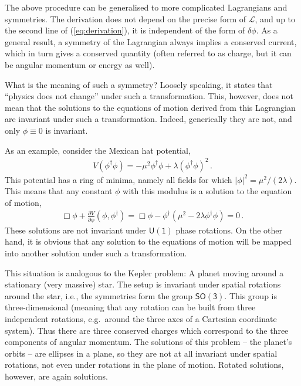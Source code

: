 \documentclass[12pt]{report}
\renewcommand{\L}{\ensuremath{\mathscr{L}}}
\newcommand{\2}{\ensuremath{\sqrt{2}\,}}
\renewcommand{\L}{\ensuremath{\mathscr{L}}}
\begin{document}
{      The above procedure can be generalised to more complicated Lagrangians and
      symmetries. The derivation does not depend on the precise form of $\L$, and up to the second
      line of (\ref{eq:derivation}), it is independent of the form of $\delta \phi$. As a general
      result, a symmetry of the Lagrangian always implies a conserved current, which in turn gives a
      conserved quantity (often referred to as charge, but it can be angular momentum or energy as
      well). 
      
      What is the meaning of such a symmetry? Loosely speaking, it states that ``physics does not
      change'' under such a transformation. This, however, does not mean that the solutions to the
      equations of motion derived from this Lagrangian are invariant under such a
      transformation. Indeed, generically they are not, and only $\phi\equiv 0$ is invariant.

      As an example, consider the Mexican hat potential,
      \begin{align}
        V(\phi^\dagger\phi)=-\mu^2 \phi^\dagger\phi +\lambda\left(\phi^\dagger\phi\right)^2\,.
      \end{align}
      This potential has a ring of minima, namely all fields for which
      $\left|\phi\right|^2=\mu^2/(2\lambda)$. This means that any constant $\phi$ with this modulus
      is a solution to the equation of motion,  
      \begin{align}
        \Box \phi +\frac{\partial V}{\partial \phi}\! \left(\phi,\phi^\dagger\right) = \Box \phi -\phi^\dagger
        \left(\mu^2-2\lambda\phi^\dagger\phi \right)=0\,.
      \end{align}
      These solutions are not invariant under $\mathsf{U(1)}$ phase rotations. On the other hand,
      it is obvious that any solution to the equations of motion will be mapped into another
      solution under such a transformation.
      
      This situation is analogous to the Kepler problem: A planet moving
      around a stationary 
      (very massive) star. The setup is invariant under spatial rotations around the star, i.e., the
      symmetries form the group $\mathsf{SO(3)}$. This group is three-dimensional 
      (meaning that any rotation can be built from three independent rotations, e.g.\ around the
      three axes of a Cartesian coordinate system). Thus there are three conserved charges
      which correspond to the three components of angular momentum. The
      solutions of this problem -- the planet's orbits -- are ellipses in a plane, so they are not
      at all invariant under spatial rotations, not even under rotations in the plane of
      motion. Rotated solutions, however, are again solutions.
      
}
\end{document}
